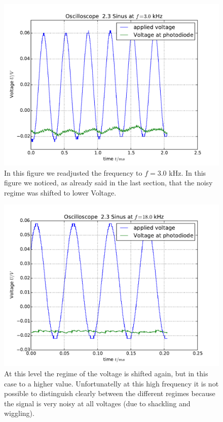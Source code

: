 \begin{figure}
    \includegraphics[width=15cm]{analysis/figures/23sinus01}
    \caption{In this figure we readjusted the frequency to
        $f=3.0$ kHz. In this figure we noticed, as already said
        in the last section, that the noisy regime was shifted
        to lower Voltage.}
\end{figure}

\begin{figure}
    \includegraphics[width=15cm]{analysis/figures/23sinus02}
    \caption{At this level the regime of the voltage is shifted
        again, but in this case to a higher value. Unfortunatelly
        at this high frequency it is not possible to distinguish
        clearly between the different regimes because the signal
        is very noisy at all voltages (due to shackling 
            and wiggling).}
\end{figure}

